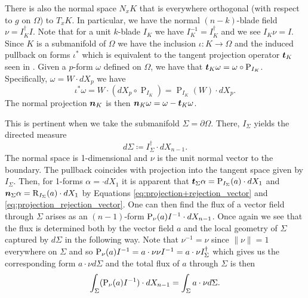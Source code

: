 There is also the normal space $N_x K$ that is everywhere orthogonal (with respect to $g$ on $\Omega$) to $T_x K$.  In particular, we have the normal $(n-k)$-blade field $\nu = I_K^\dagger I$. Note that for a unit $k$-blade $I_K$ we have $I_K^{-1}=I_K^\dagger$ and we see $I_K \nu = I$. Since $K$ is a submanifold of $\Omega$ we have the inclusion $\iota \colon K \to \Omega$ and the induced pullback on forms $\iota^*$ which is equivalent to the tangent projection operator $\boldsymbol{t}_K$ seen in \cite{schwarz_hodge_1995}. Given a $p$-form $\omega$ defined on $\Omega$, we have that $\boldsymbol{t}_K \omega = \omega \circ \operatorname{P}_{I_K}$. Specifically, $\omega = W \cdot dX_p$ we have 
\[
\iota^* \omega  = W \cdot (dX_p \circ \operatorname{P}_{I_K}) = \operatorname{P}_{I_K}(W) \cdot dX_p.
\]
The normal projection $\boldsymbol{n}_K$ is then $\boldsymbol{n}_K \omega = \omega - \boldsymbol{t}_K \omega$. 

This is pertinent when we take the submanifold $\Sigma = \partial \Omega$. There, $I_\Sigma$ yields the directed measure
\[
d\Sigma \coloneqq I_\Sigma^\dagger \cdot dX_{n-1}.
\]
The normal space is 1-dimensional and $\nu$ is the unit normal vector to the boundary. The pullback coincides with projection into the tangent space given by $I_\Sigma$.  Then, for 1-forms $\alpha = \cdot dX_1$ it is apparent that $\boldsymbol{t}_\Sigma \alpha = \operatorname{P}_{I_\Sigma}(a) \cdot dX_1$ and $\boldsymbol{n}_\Sigma \alpha = \operatorname{R}_{I_\Sigma}(a) \cdot dX_1$ by Equations \ref{eq:projection+rejection_vector} and \ref{eq:projection_rejection_vector}. One can then find the flux of a vector field through $\Sigma$ arises as an $(n-1)$-form $\operatorname{P}_{\nu}(a) I^{-1} \cdot dX_{n-1}$. Once again we see that the flux is determined both by the vector field $a$ and the local geometry of $\Sigma$ captured by $d\Sigma$ in the following way. Note that  $\nu^{-1}=\nu$ since $\|\nu\|=1$ everywhere on $\Sigma$ and so $\operatorname{P}_{\nu}(a) I^{-1}= a \cdot \nu \nu I^{-1} = a \cdot \nu I_\Sigma^\dagger$ which gives us the corresponding form $a \cdot \nu d\Sigma$ and the total flux of $a$ through $\Sigma$ is then
\[
\int_\Sigma (\operatorname{P}_{\nu}(a) I^{-1}) \cdot dX_{n-1} = \int_\Sigma a \cdot \nu d\Sigma.
\]

